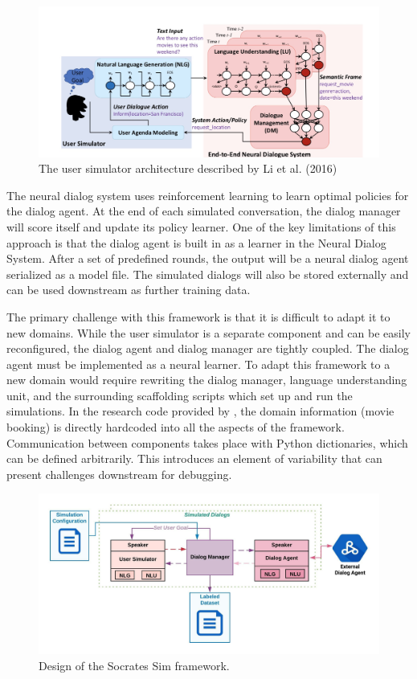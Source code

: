 \begin{figure}[h!]
	\label{fig:li_end_end}
	\includegraphics[width=\linewidth]{diagrams/li_end_to_end.jpeg}
	\caption{ The user simulator architecture described by Li et al. (2016) }
\end{figure}

The neural dialog system uses reinforcement learning to learn optimal policies for the dialog agent. At the end of each simulated conversation, the dialog manager will score itself and update its policy learner. One of the key limitations of this approach is that the dialog agent is built in as a learner in the Neural Dialog System. After a set of predefined rounds, the output will be a neural dialog agent serialized as a model file. The simulated dialogs will also be stored externally and can be used downstream as further training data.

The primary challenge with this framework is that it is difficult to adapt it to new domains. While the user simulator is a separate component and can be easily reconfigured, the dialog agent and dialog manager are tightly coupled. The dialog agent must be implemented as a neural learner. To adapt this framework to a new domain would require rewriting the dialog manager, language understanding unit, and the surrounding scaffolding scripts which set up and run the simulations. In the research code provided by \cite{li_end_to_end}, the domain information (movie booking) is directly hardcoded into all the aspects of the framework. Communication between components takes place with Python dictionaries, which can be defined arbitrarily. This introduces an element of variability that can present challenges downstream for debugging.

\begin{figure}[h!]
	\label{fig:socrates_sim_framework}
	\includegraphics[width=\linewidth]{diagrams/socrates_diagram.jpeg}
	\caption{ Design of the Socrates Sim framework. }
\end{figure}

